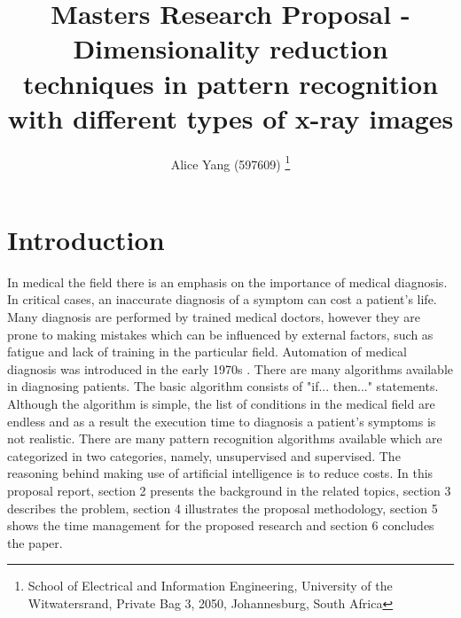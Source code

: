 \documentclass[11pt,twocolumn]{witseiepaper}
\begin{document}
	\title{Masters Research Proposal - Dimensionality reduction techniques in pattern recognition with different types of x-ray images }
	
	\author{Alice Yang (597609) \thanks{School of Electrical and Information Engineering, University of the Witwatersrand, Private Bag 3, 2050, Johannesburg, South Africa} }
	
	
	\maketitle
	\thispagestyle{empty}\pagestyle{empty}
	
	\section{Introduction}
	In medical the field there is an emphasis on the importance of medical diagnosis. In critical cases, an inaccurate diagnosis of a symptom can cost a patient's life. Many diagnosis are performed by trained medical doctors, however they are prone to making mistakes which can be influenced by external factors, such as fatigue and lack of training in the particular field. Automation of medical diagnosis was introduced in the early 1970s \cite{Ramesh2004}. There are many algorithms available in diagnosing patients. The basic algorithm consists of "if... then..." statements. Although the algorithm is simple, the list of conditions in the medical field are endless and as a result the execution time to diagnosis a patient's symptoms is not realistic. There are many pattern recognition algorithms available which are categorized in two categories, namely, unsupervised and supervised. The reasoning behind making use of artificial intelligence is to reduce costs. In this proposal report, section 2 presents the background in the related topics, section 3 describes the problem, section 4 illustrates the proposal methodology, section 5 shows the time management for the proposed research and section 6 concludes the paper. 
	
\end{document}
